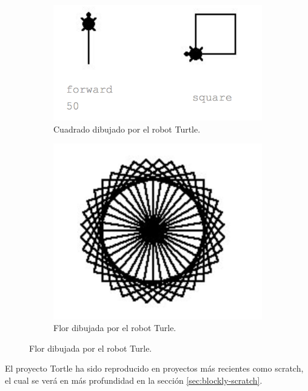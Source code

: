 \begin{figure}[!ht]
	\begin{adjustwidth}{\oddsidemargin-1in}{\rightmargin}
			\begin{subfigure}{\paperwidth}
				\centering
				\includegraphics[scale=.45]{images/square-turtle.png}
				\caption{Cuadrado dibujado por el robot Turtle.}
				\label{fig:square-turtle}
			\end{subfigure}
			\begin{subfigure}{\paperwidth}
				\centering
				\includegraphics[scale=.45]{images/flower-turtle.png}
				\caption{Flor dibujada por el robot Turle.}
				\label{fig:flower-turtle}
			\end{subfigure}
		\label{fig:square-flower-turtle}
	\end{adjustwidth}
\end{figure}


El proyecto Tortle ha sido reproducido en proyectos más recientes como \Gls{scratch}\cite{scratch}, el cual se verá en más profundidad en la sección \ref{sec:blockly-scratch}.



